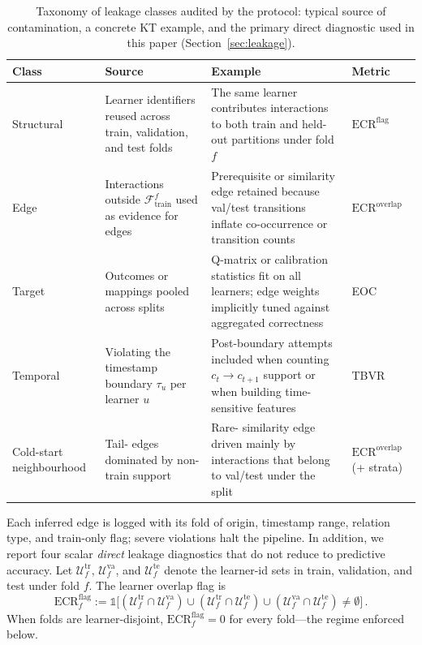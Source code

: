\begin{table}[t]
\centering
\caption{Taxonomy of leakage classes audited by the protocol: typical
source of contamination, a concrete KT example, and the primary
direct diagnostic used in this paper (Section~\ref{sec:leakage}).}
\label{tab:leakage-taxonomy}
\footnotesize
\setlength{\tabcolsep}{3pt}
\begin{tabularx}{\columnwidth}{@{}
  >{\RaggedRight\arraybackslash}p{11mm}
  >{\RaggedRight\arraybackslash}X
  >{\RaggedRight\arraybackslash}X
  >{\RaggedRight\arraybackslash}p{16mm}
@{}}
\toprule
Class & Source & Example & Metric \\
\midrule
Structural &
Learner identifiers reused across train, validation, and test folds &
The same learner contributes interactions to both train and held-out partitions under fold $f$ &
$\mathrm{ECR}^{\mathrm{flag}}$ \\
Edge &
Interactions outside $\mathcal{F}_{\text{train}}^f$ used as evidence for edges &
Prerequisite or similarity edge retained because val/test transitions inflate co-occurrence or transition counts &
$\mathrm{ECR}^{\mathrm{overlap}}$ \\
Target &
Outcomes or mappings pooled across splits &
Q-matrix or calibration statistics fit on all learners; edge weights implicitly tuned against aggregated correctness &
EOC \\
Temporal &
Violating the timestamp boundary $\tau_u$ per learner $u$ &
Post-boundary attempts included when counting $c_t\!\to\!c_{t+1}$ support or when building time-sensitive features &
TBVR \\
Cold-start neighbourhood &
Tail-\KC{} edges dominated by non-train support &
Rare-\KC{} similarity edge driven mainly by interactions that belong to val/test under the split &
$\mathrm{ECR}^{\mathrm{overlap}}$ (+ strata) \\
\bottomrule
\end{tabularx}
\end{table}

Each inferred edge is logged with its fold of origin, timestamp range,
relation type, and train-only flag; severe violations halt the pipeline.
In addition, we report four scalar \emph{direct} leakage diagnostics that do
not reduce to predictive accuracy. Let $\mathcal{U}^{\mathrm{tr}}_f$,
$\mathcal{U}^{\mathrm{va}}_f$, and $\mathcal{U}^{\mathrm{te}}_f$ denote the
learner-id sets in train, validation, and test under fold $f$. The learner overlap flag is
\begin{equation}
\mathrm{ECR}^{\mathrm{flag}}_f := \mathbb{1}\big[
(\mathcal{U}^{\mathrm{tr}}_f \cap \mathcal{U}^{\mathrm{va}}_f) \cup
(\mathcal{U}^{\mathrm{tr}}_f \cap \mathcal{U}^{\mathrm{te}}_f) \cup
(\mathcal{U}^{\mathrm{va}}_f \cap \mathcal{U}^{\mathrm{te}}_f)
\neq \emptyset
\big]\,.
\label{eq:ecr-flag}
\end{equation}
When folds are learner-disjoint, $\mathrm{ECR}^{\mathrm{flag}}_f=0$ for every fold---the regime enforced below.

